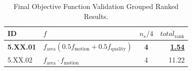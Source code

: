 \begin{table}[ht]
\centering
\footnotesize
\caption{Final Objective Function Validation Grouped Ranked Results.}
\label{tab:final_validation_grouped_ranked}
\begin{tabular}{@{}llcr@{}}
\hline
    ID & $f$ & $n_s/4$ & $\overline{total_{\text{rank}}}$ \\
\hline
    \textbf{5.XX.01} & \textbf{$f_{\text{area}}(0.5f_{\text{motion}} + 0.5f_{\text{quality}})$} & \textbf{4} & \textbf{\underline{1.54}} \\
    5.XX.02 & $f_{\text{area}} \cdot f_{\text{motion}}$ & 4 & 11.22 \\
\hline
\end{tabular}
\end{table}